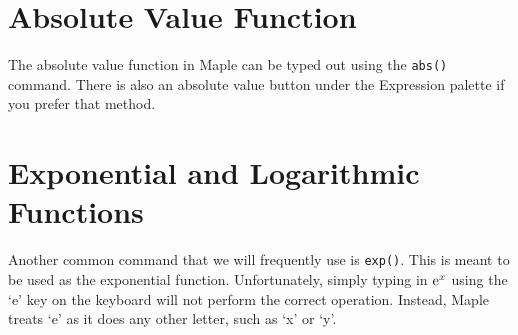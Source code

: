 \section{Absolute Value Function}
\label{sec:absolute_value_function}

The absolute value function in Maple can be typed out using the \texttt{abs()} command. There is also an absolute value button under the Expression palette if you prefer that method.

\begin{maplegroup}
\begin{mapleinput}
\end{mapleinput}
\mapleresult
\begin{maplelatex}
\end{maplelatex}
\end{maplegroup}

\section{Exponential and Logarithmic Functions}
\label{sec:exponential_and_logarithmic_functions}

Another common command that we will frequently use is \texttt{exp()}. This is meant to be used as the exponential function. Unfortunately, simply typing in ${\rm e}^x$ using the `e' key on the keyboard will not perform the correct operation. Instead, Maple treats `e' as it does any other letter, such as `x' or `y'.


\begin{maplegroup}
\begin{mapleinput}
\end{mapleinput}
\mapleresult
\begin{maplelatex}
\end{maplelatex}
\end{maplegroup}

